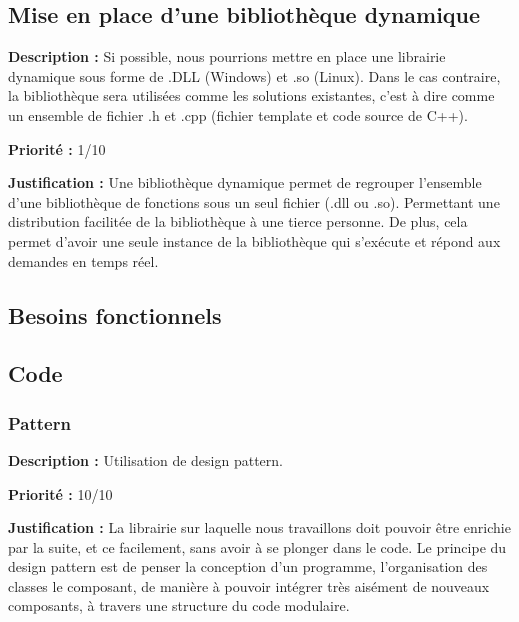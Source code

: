 \begin{titlepage}
\subsection{Mise en place d'une bibliothèque dynamique}
{
\textbf{Description :} Si possible, nous pourrions mettre en place une librairie dynamique sous forme de .DLL (Windows) et .so (Linux). \cite{dll1}\cite{dll2}\cite{dll3} Dans le cas contraire, la bibliothèque sera utilisées comme les solutions existantes, c'est à dire comme un ensemble de fichier .h et .cpp (fichier template et code source de C++).

\textbf{Priorité :} 1/10

\textbf{Justification :} Une bibliothèque dynamique permet de regrouper l'ensemble d'une bibliothèque de fonctions sous un seul fichier (.dll ou .so). Permettant une distribution facilitée de la bibliothèque à une tierce personne. De plus, cela permet d'avoir une seule instance de la bibliothèque qui s'exécute et répond aux demandes en temps réel.
}


\newpage
\begin{center}
\begin{bf}
\section{Besoins fonctionnels}
\end{bf}
\end{center}

\subsection{Code}

\subsubsection{Pattern}
{
\textbf{Description :} Utilisation de design pattern.

\textbf{Priorité :} 10/10

\textbf{Justification :} La librairie sur laquelle nous travaillons doit pouvoir être enrichie par la suite, et ce facilement, sans avoir à se plonger dans le code. Le principe du design pattern est de penser la conception d'un programme, l'organisation des classes le composant, de manière à pouvoir intégrer très aisément de nouveaux composants, à travers une structure du code modulaire.
}


\end{titlepage}
